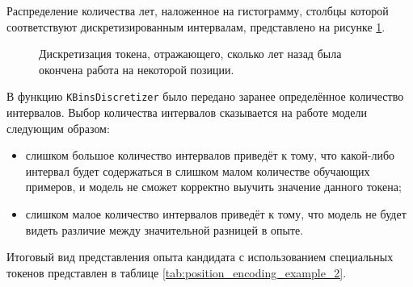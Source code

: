 \documentclass[14pt]{mmcs_article}
\begin{document}
Распределение количества лет, наложенное на гистограмму, столбцы которой соответствуют дискретизированным интервалам, представлено на рисунке \ref{fig:experience_distribution}.

\begin{figure}[H]
  \centering
  \caption{\centering Дискретизация токена, отражающего, сколько лет назад была окончена работа на некоторой позиции.}
  \label{fig:experience_distribution}
\end{figure}


В функцию \texttt{KBinsDiscretizer} было передано заранее определённое количество интервалов. Выбор количества интервалов сказывается на работе модели следующим образом:

\begin{itemize}
  \item слишком большое количество интервалов приведёт к тому, что какой-либо интервал будет содержаться в слишком малом количестве обучающих примеров, и модель не сможет корректно выучить значение данного токена;
  \item слишком малое количество интервалов приведёт к тому, что модель не будет видеть различие между значительной разницей в опыте.
\end{itemize}

Итоговый вид представления опыта кандидата с использованием специальных токенов представлен в таблице \ref{tab:position_encoding_example_2}.
\end{document}
